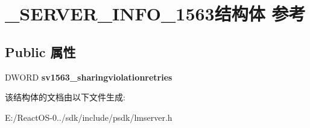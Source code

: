 \hypertarget{struct___s_e_r_v_e_r___i_n_f_o__1563}{}\section{\+\_\+\+S\+E\+R\+V\+E\+R\+\_\+\+I\+N\+F\+O\+\_\+1563结构体 参考}
\label{struct___s_e_r_v_e_r___i_n_f_o__1563}
\subsection*{Public 属性}
\begin{DoxyCompactItemize}
\item 
\mbox{\label{struct___s_e_r_v_e_r___i_n_f_o__1563_a4fc188e65c93ec62a1e057c5dd7190dd}} 
D\+W\+O\+RD {\bfseries sv1563\+\_\+sharingviolationretries}
\end{DoxyCompactItemize}


该结构体的文档由以下文件生成\+:\begin{DoxyCompactItemize}
\item 
E\+:/\+React\+O\+S-\/0../sdk/include/psdk/lmserver.\+h\end{DoxyCompactItemize}
